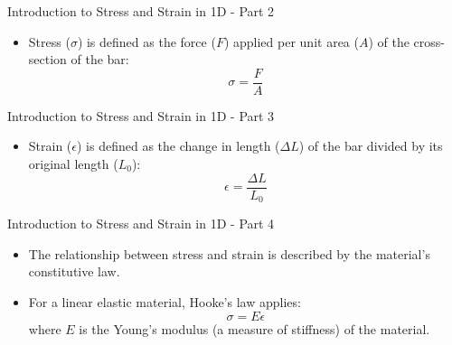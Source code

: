 \documentclass{beamer}
\begin{document}
\begin{frame}{Introduction to Stress and Strain in 1D - Part 2}
    \begin{itemize}
        \item Stress ($\sigma$) is defined as the force ($F$) applied per unit area ($A$) of the cross-section of the bar:
        \begin{equation*}
        \sigma = \frac{F}{A}
        \end{equation*}
    \end{itemize}
\end{frame}

\begin{frame}{Introduction to Stress and Strain in 1D - Part 3}
    \begin{itemize}
        \item Strain ($\epsilon$) is defined as the change in length ($\Delta L$) of the bar divided by its original length ($L_0$):
        \begin{equation*}
        \epsilon = \frac{\Delta L}{L_0}
        \end{equation*}
    \end{itemize}
\end{frame}

\begin{frame}{Introduction to Stress and Strain in 1D - Part 4}
    \begin{itemize}
        \item The relationship between stress and strain is described by the material's constitutive law.
        \item For a linear elastic material, Hooke's law applies:
        \begin{equation*}
        \sigma = E \epsilon
        \end{equation*}
        where $E$ is the Young's modulus (a measure of stiffness) of the material.
    \end{itemize}
\end{frame}
\end{document}
